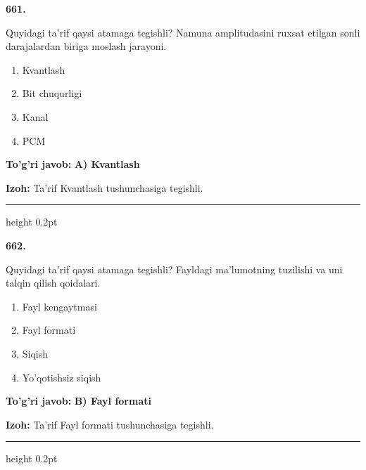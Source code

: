 \documentclass[10pt,a4paper,oneside]{article}
\begin{document}
\noindent\textbf{\color{ink}661.}
\par
Quyidagi ta'rif qaysi atamaga tegishli? Namuna amplitudasini ruxsat etilgan sonli darajalardan biriga moslash jarayoni.
\begin{enumerate}[label=\Alph*),leftmargin=9mm]
\item Kvantlash
\item Bit chuqurligi
\item Kanal
\item PCM
\end{enumerate}
\begin{tcolorbox}[enhanced,breakable,colback=teal!4,colframe=teal!50!black,boxrule=0.5pt,arc=1.1mm,left=3mm,right=3mm,top=1.7mm,bottom=1.7mm,before skip=2mm,after skip=2mm]
\textbf{\color{teal}To'g'ri javob:} \textbf{A) Kvantlash}
\par\smallskip
\textbf{Izoh:} Ta'rif Kvantlash tushunchasiga tegishli.
\end{tcolorbox}
\vspace{2mm}\hrule height 0.2pt \vspace{3mm}

\noindent\textbf{\color{ink}662.}
\par
Quyidagi ta'rif qaysi atamaga tegishli? Fayldagi ma'lumotning tuzilishi va uni talqin qilish qoidalari.
\begin{enumerate}[label=\Alph*),leftmargin=9mm]
\item Fayl kengaytmasi
\item Fayl formati
\item Siqish
\item Yo'qotishsiz siqish
\end{enumerate}
\begin{tcolorbox}[enhanced,breakable,colback=teal!4,colframe=teal!50!black,boxrule=0.5pt,arc=1.1mm,left=3mm,right=3mm,top=1.7mm,bottom=1.7mm,before skip=2mm,after skip=2mm]
\textbf{\color{teal}To'g'ri javob:} \textbf{B) Fayl formati}
\par\smallskip
\textbf{Izoh:} Ta'rif Fayl formati tushunchasiga tegishli.
\end{tcolorbox}
\vspace{2mm}\hrule height 0.2pt \vspace{3mm}
\end{document}
